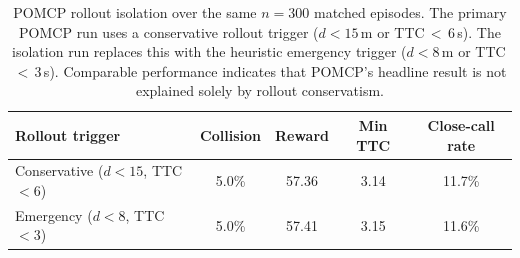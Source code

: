 \begin{table}[htbp]
\centering
\caption{POMCP rollout isolation over the same $n{=}300$ matched episodes.
  The primary POMCP run uses a conservative rollout trigger
  ($d{<}15$\,m or TTC\,$<$\,6\,s). The isolation run replaces this with the
  heuristic emergency trigger ($d{<}8$\,m or TTC\,$<$\,3\,s). Comparable
  performance indicates that POMCP's headline result is not explained solely
  by rollout conservatism.}
\label{tab:pomcp_rollout_ablation}
\small
\begin{tabular}{lcccc}
\toprule
\textbf{Rollout trigger} & \textbf{Collision} & \textbf{Reward} &
\textbf{Min TTC} & \textbf{Close-call rate} \\
\midrule
Conservative ($d{<}15$, TTC$<6$) & 5.0\% & 57.36 & 3.14 & 11.7\% \\
Emergency ($d{<}8$, TTC$<3$)     & 5.0\% & 57.41 & 3.15 & 11.6\% \\
\bottomrule
\end{tabular}
\end{table}

